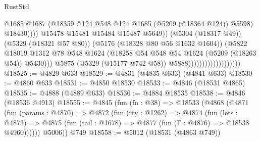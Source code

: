 \begin{lexlean}{RustStd}
\begin{coremodule}
                                                        @1685
                                                        @1687
                                                        (@18359
                                                          @124
                                                          @548
                                                          @124
                                                          @1685
                                                          (@5209 (@18364 @124))
                                                          @5598)
                                                        @18430))))
                                                @15478
                                                @15481
                                                @15484
                                                @15487
                                                @5649))
                                            (@5304 (@18317 @49))
                                            (@5329 (@18321 @57 @80))
                                            (@5176 (@18328 @80 @56 @1632 @1604))
                                            (@5822
                                              @18019
                                              @1312
                                              @78
                                              @548
                                              @1624
                                              (@18258
                                                @54
                                                @548
                                                @54
                                                @1624
                                                (@5209 (@18263 @54))
                                                @5430)))
                                          @5875
                                          (@5329 (@15177 @742 @58))
                                          @5888)))))))))))))))))))
@18525 := @4829 @633
@18529 := @4831 (@4835 @633) (@4841 @633)
@18530 := @4860 @633
@18531 := @4850 @18530
@18533 := @4846 (@18531 @4865)
@18535 := @4888 (@4889 @633)
@18536 := @4884 @18535
@18538 := @4846 (@18536 @4913)
@18555 := @4845
    (fun (fn : @38) =>
    @18533
      (@4868
        (@4871
          (fun (params : @4870) =>
          @4872
            (fun (rty : @1262) =>
            @4874
              (fun (lets : @4873) =>
              @4875 (fun (tail : @1678) => @4877 (fun (Γ : @4876) => @18538 @4960))))))
        @5006))
    @749
@18558 := @5012 (@18531 (@4863 @749))

\end{coremodule}
\end{lexlean}
